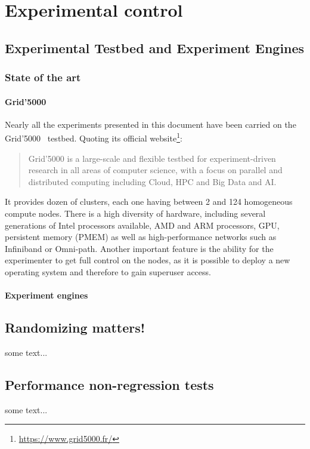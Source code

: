 \chapter{Experimental control}
\label{chapter:experiment}

\section{Experimental Testbed and Experiment Engines}%
\label{sec:experiment:testbed}

    \subsection{State of the art}%
    \label{sub:state_of_the_art}

        \subsubsection{Grid'5000}%
        \label{ssub:grid_5000}

            Nearly all the experiments presented in this document have been carried on the Grid'5000~\cite{grid5000}
            testbed.  Quoting its official website\footnote{\url{https://www.grid5000.fr/}}: \blockquote{Grid'5000 is a
            large-scale and flexible testbed for experiment-driven research in all areas of computer science, with a
            focus on parallel and distributed computing including Cloud, HPC and Big Data and AI.} It provides dozen of
            clusters, each one having between 2 and 124 homogeneous compute nodes. There is a high diversity of hardware,
            including several generations of Intel processors available, AMD and ARM processors, GPU, persistent memory
            (PMEM) as well as high-performance networks such as Infiniband or Omni-path. Another important feature is the
            ability for the experimenter to get full control on the nodes, as it is possible to deploy a new operating
            system and therefore to gain superuser access.

        \subsubsection{Experiment engines}%
        \label{ssub:experiment_engines}




\section{Randomizing matters!}%
\label{sec:experiment:randomizing}

    some text...

\section{Performance non-regression tests}%
\label{sec:experiment:tests}

    some text...
